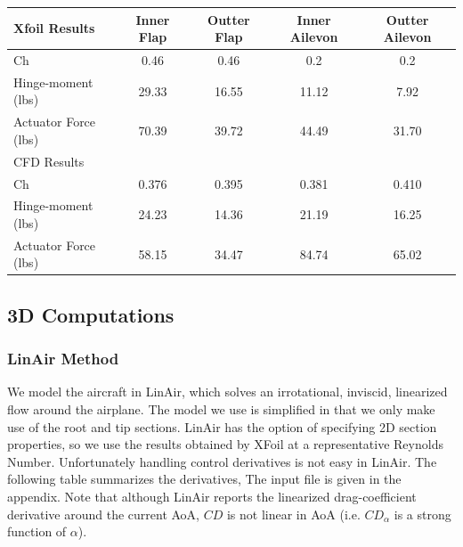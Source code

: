 \documentclass[titlepage,10pt]{article}
\begin{document}
\begin{table}[h]
\begin{center}
\begin{tabular}{|l | c | c | c| c|}
\hline
	Xfoil Results & Inner Flap & Outter Flap & Inner Ailevon & Outter Ailevon\\
\hline
Ch &0.46&	0.46	&0.2	&0.2\\
Hinge-moment (lbs) & 29.33	&16.55	&11.12&	7.92\\
Actuator Force (lbs)& 70.39	&39.72	&44.49&	31.70\\
\hline
\hline
	CFD Results &  & & & \\
\hline
Ch & 0.376&	0.395	&0.381	&0.410	\\		
Hinge-moment (lbs) & 24.23&	14.36	&21.19&	16.25\\
Actuator Force (lbs)& 58.15&	34.47&	84.74	&65.02 \\
\hline
\end{tabular}
\end{center}
\end{table}

			

\subsection{3D Computations}
\subsubsection{LinAir Method}
We model the aircraft in LinAir, which solves an irrotational, inviscid, linearized flow around the airplane. The model we use is simplified in that we only make use of the root and tip sections. LinAir has the option of specifying 2D section properties, so we use the results obtained by XFoil at a representative Reynolds Number. Unfortunately handling control derivatives is not easy in LinAir. The following table summarizes the derivatives, The input file is given in the appendix. Note that although LinAir reports the linearized drag-coefficient derivative around the current AoA, $CD$ is not linear in AoA (i.e. $CD_{\alpha}$ is a strong function of $\alpha$).
\end{document}

